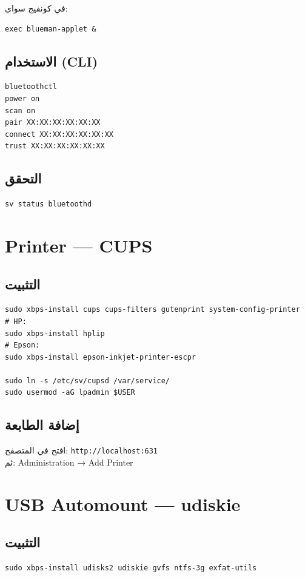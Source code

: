 \documentclass[12pt, a4paper]{report}
\begin{document}
في كونفيج سواي:
\begin{lstlisting}
exec blueman-applet &
\end{lstlisting}

\subsection{الاستخدام (CLI)}
\begin{lstlisting}
bluetoothctl
power on
scan on
pair XX:XX:XX:XX:XX:XX
connect XX:XX:XX:XX:XX:XX
trust XX:XX:XX:XX:XX:XX
\end{lstlisting}

\subsection{التحقق}
\begin{lstlisting}
sv status bluetoothd
\end{lstlisting}

\section{Printer — CUPS}

\subsection{التثبيت}
\begin{lstlisting}
sudo xbps-install cups cups-filters gutenprint system-config-printer
# HP:
sudo xbps-install hplip
# Epson:
sudo xbps-install epson-inkjet-printer-escpr

sudo ln -s /etc/sv/cupsd /var/service/
sudo usermod -aG lpadmin $USER
\end{lstlisting}

\subsection{إضافة الطابعة}
افتح في المتصفح: \texttt{http://localhost:631}\\
ثم: Administration → Add Printer

\section{USB Automount — udiskie}

\subsection{التثبيت}
\begin{lstlisting}
sudo xbps-install udisks2 udiskie gvfs ntfs-3g exfat-utils
\end{lstlisting}
\end{document}
